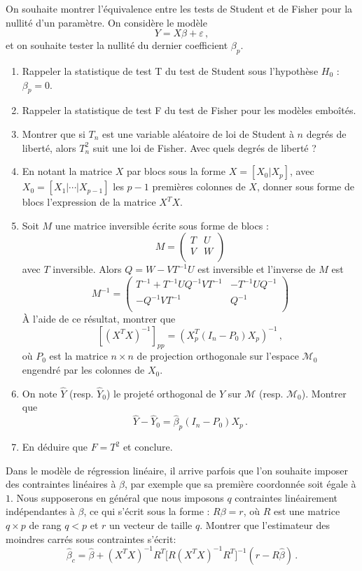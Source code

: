 \documentclass{td_um}
\providecommand{\1}{\mathds{1}}
\begin{document}
	On souhaite montrer l'équivalence entre les tests de Student et de Fisher pour la nullité d'un paramètre. On considère le modèle
	\[
	Y = X \beta + \varepsilon\,,
	\]
	et on souhaite tester la nullité du dernier coefficient $\beta_p$.
	\begin{enumerate}
		\item Rappeler la statistique de test T du test de Student sous l'hypothèse $H_0$ : $\beta_p = 0$.
		\item Rappeler la statistique de test F du test de Fisher pour les modèles emboîtés.
		\item Montrer que si $T_n$ est une variable aléatoire de loi de Student à $n$ degrés de liberté, alors $T_n^2$ suit une loi de Fisher. Avec quels degrés de liberté ?
		\item En notant la matrice $X$ par blocs sous la forme $X = [X_0 | X_p]$, avec $X_0 = [X_1 | \cdots | X_{p-1}]$ les $p-1$ premières colonnes de $X$, donner sous forme de blocs l'expression de la matrice $X^T X$.
		\item Soit $M$ une matrice inversible écrite sous forme de blocs :
		\[
		M =\left (
		\begin{array}{c|c}
			T & U \\
			\hline
			V & W\\ 
		\end{array}
		\right)
		\]
		avec $T$ inversible. Alors $Q = W - VT^{-1}U$ est inversible et l'inverse de $M$ est
		\[
		M^{-1} = \left (
		\begin{array}{c|c}
			T^{-1} + T^{-1}UQ^{-1}VT^{-1} & -T^{-1}UQ^{-1} \\
			\hline
			-Q^{-1}VT^{-1} & Q^{-1}\\ 
		\end{array}
		\right)
		\]
		À l'aide de ce résultat, montrer que
		\[
		[(X^T X)^{-1}]_{pp} = (X_p^T (I_n - P_0) X_p)^{-1}\,,
		\]
		où $P_0$ est la matrice $n \times n$ de projection orthogonale sur l'espace $\mathcal{M}_0$ engendré par les colonnes de $X_0$.
		\item On note $\hat Y$ (resp. $\hat Y_0$) le projeté orthogonal de $Y$ sur $\mathcal{M}$ (resp. $\mathcal{M}_0$). Montrer que
		\[
		\hat Y - \hat Y_0 = \hat \beta_p (I_n - P_0) X_p\,.
		\]
		\item En déduire que $F = T^2$ et conclure.
	\end{enumerate}
	
	 Dans le modèle de régression linéaire, il arrive parfois que l'on souhaite imposer des contraintes linéaires à $\beta$, par exemple que sa première coordonnée soit égale à $1$. Nous supposerons en général que nous imposons $q$ contraintes linéairement indépendantes à $\beta$, ce qui s'écrit sous la forme : $R \beta=r$, où $R$ est une matrice $q \times p$ de rang $q<p$ et $r$ un vecteur de taille $q$. Montrer que l'estimateur des moindres carrés sous contraintes s'écrit:
	\[
	\hat \beta_c = \hat \beta + (X^T X)^{-1} R^T  \big[ R (X^T X)^{-1} R^T \big]^{-1} (r - R \hat \beta)\,.
	\]
	
\end{document}
